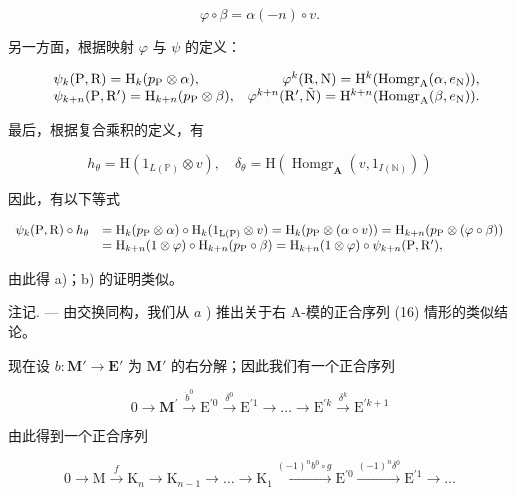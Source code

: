\[
\varphi \circ \beta = \alpha (- n) \circ v.
\]

另一方面，根据映射 \(\varphi\) 与 \(\psi\) 的定义：

\[
\begin{array}{r l r} & {\psi_ {k} (\mathrm{P}, \mathrm{R}) = \mathrm{H} _ {k} (p _ {\mathrm{P}} \otimes \alpha),} & {\varphi^ {k} (\mathrm{R}, \mathrm{N}) = \mathrm{H} ^ {k} (\mathrm{Homgr} _ {\mathrm{A}} (\alpha , e _ {\mathrm{N}})),} \\ & {\psi_ {k + n} (\mathrm{P}, \mathrm{R} ^ {\prime}) = \mathrm{H} _ {k + n} (p _ {\mathrm{P}} \otimes \beta),} & {\varphi^ {k + n} (\mathrm{R} ^ {\prime}, \tilde {\mathrm{N}}) = \mathrm{H} ^ {k + n} (\mathrm{Homgr} _ {\mathrm{A}} (\beta , e _ {\mathrm{N}})).} \end{array}
\]

最后，根据复合乘积的定义，有

\[
h _ {\theta} = \mathrm{H} (1 _ {L (\mathbb {P})} \otimes v), \quad \delta_ {\theta} = \mathrm{H} (\operatorname{Homgr} _ {\mathbf {A}} (v, 1 _ {I (\mathbb {N})}))
\]

因此，有以下等式

\[
\begin{array}{r l} \psi_ {k} (\mathrm{P}, \mathrm{R}) \circ h _ {\theta} & = \mathrm{H} _ {k} (p _ {\mathrm{P}} \otimes \alpha) \circ \mathrm{H} _ {k} (1 _ {\mathrm{L(P)}} \otimes v) = \mathrm{H} _ {k} (p _ {\mathrm{P}} \otimes (\alpha \circ v)) = \mathrm{H} _ {k + n} (p _ {\mathrm{P}} \otimes (\varphi \circ \beta)) \\ & = \mathrm{H} _ {k + n} (1 \otimes \varphi) \circ \mathrm{H} _ {k + n} (p _ {\mathrm{P}} \circ \beta) = \mathrm{H} _ {k + n} (1 \otimes \varphi) \circ \psi_ {k + n} (\mathrm{P}, \mathrm{R} ^ {\prime}), \end{array}
\]

由此得 a)；b) 的证明类似。

注记. --- 由交换同构，我们从 \(a\) ) 推出关于右 A-模的正合序列 (16) 情形的类似结论。

现在设 \(b: \mathbf{M}' \to \mathbf{E}'\) 为 \(\mathbf{M}'\) 的右分解；因此我们有一个正合序列

\[
0 \rightarrow \mathbf {M} ^ {\prime} \xrightarrow {\dot {b} ^ {0}} \mathrm{E} ^ {\prime 0} \xrightarrow {\delta^ {0}} \mathrm{E} ^ {\prime 1} \rightarrow \dots \rightarrow \mathrm{E} ^ {\prime k} \xrightarrow {\delta^ {k}} \mathrm{E} ^ {\prime k + 1}
\]

由此得到一个正合序列

\[
0 \rightarrow \mathrm{M} \xrightarrow {f} \mathrm{K} _ {n} \rightarrow \mathrm{K} _ {n - 1} \rightarrow \dots \rightarrow \mathrm{K} _ {1} \xrightarrow {(- 1) ^ {n} b ^ {0} \circ g} \mathrm{E} ^ {\prime 0} \xrightarrow {(- 1) ^ {n} \delta^ {0}} \mathrm{E} ^ {\prime 1} \rightarrow \dots
\]

